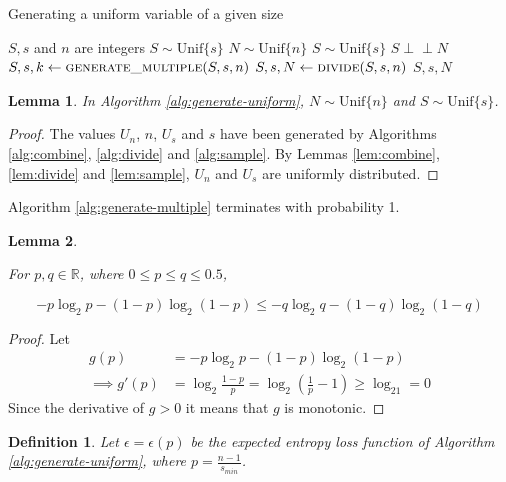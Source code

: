 \documentclass[12pt]{article}
\newtheorem{lemma}{Lemma}
\newtheorem{definition}{Definition}
\newcommand{\indep}{\perp\!\!\!\perp}
\newcommand{\unif}[1]{\mathrm{Unif}\{#1\}}
\begin{document}
\begin{algorithm}
\caption{Generating a uniform variable of a given size}
\label{alg:generate-uniform}
\begin{algorithmic}[1]
\Require $S, s$ and $n$ are integers
\Require $S \sim \unif{s}$
\Ensure $N \sim \unif{n}$
\Ensure $S \sim \unif{s}$
\Ensure $S \indep N$
  \State $S, s, k \gets \textsc{generate\_multiple}(S, s, n)$
  \State $S, s, N \gets \textsc{divide}(S, s, n)$
  \State \Return $S, s, N$
\EndProcedure
\end{algorithmic}
\end{algorithm}

\begin{lemma}
    In Algorithm \ref{alg:generate-uniform}, 
$N \sim \unif{n}$ and $S \sim \unif{s}$.
\end{lemma}

\begin{proof}
The values $U_n$, $n$, $U_s$ and $s$ have been generated by Algorithms \ref{alg:combine}, \ref{alg:divide} and \ref{alg:sample}. By Lemmas \ref{lem:combine}, \ref{lem:divide} and \ref{lem:sample}, $U_n$ and $U_s$ are uniformly distributed.
\end{proof}

Algorithm \ref{alg:generate-multiple} terminates with probability 1.

\begin{lemma}
    \label{lem:shannon-inequality}

For $p,q \in \mathbb{R}$, where $0 \le p\le q \le 0.5$, 

\begin{equation}
-p\log_2 p - (1-p)\log_2(1-p) \le -q\log_2 q - (1-q)\log_2(1-q)
\end{equation}
\end{lemma}

\begin{proof}
    Let
    \begin{align}
        g(p) & = -p\log_2 p - (1-p)\log_2(1-p) \\
        \implies g'(p) & = \log_2\frac{1-p}{p} = \log_2(\frac{1}{p}-1) \ge \log_21 = 0 
    \end{align}
Since the derivative of $g>0$ it means that $g$ is monotonic.
\end{proof}

\begin{definition}
    Let $\epsilon = \epsilon(p)$ be the expected entropy loss function of Algorithm \ref{alg:generate-uniform}, where $p=\frac{n-1}{s_{min}}$.
\end{definition}
\end{document}
